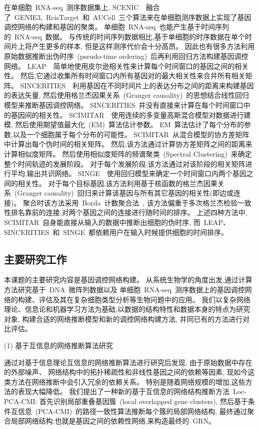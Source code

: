 在单细胞~RNA-seq~测序数据集上, 
SCENIC~\cite{aibar2017scenic}~融合了~GENIE3,~RcisTarget~和~AUCell~三个算法来在单细胞测序数据上实现了基因调控网络的构建和基因的聚类。
单细胞~RNA-seq~也能产生基于时间序列的~RNA-seq~数据。
与传统的时间序列数据相比,基于单细胞的时序数据在单个时间片上将产生更多的样本, 但是这样测序代价会十分高昂。
因此也有很多方法利用原始数据推断出伪时序~(pseudo-time ordering)~后再利用回归方法构建基因调控网络。
LEAP~\cite{specht2017leap}~简单地使用皮尔逊相关性来计算每个时间窗口的基因之间的相关性。 
然后,它通过收集所有时间窗口内所有基因对的最大相关性来合并所有相关矩阵。
SINCERITIES~\cite{papili2017sincerities}~利用基因在不同时间片上的表达分布之间的距离来构建基因的表达矢量,
然后使用格兰杰因果关系~(Granger causality)~的思想结合线性回归模型来推断基因调控网络。
SINCERITIES~并没有直接来计算在每个时间窗口中的基因间的相关性。
SCIMITAR~\cite{cordero2017tracing}~使用连续的多变量高斯混合模型对数据进行建模,
然后使用期望值最大化~(EM)~算法估计参数。
EM~算法估计了每个分布的参数,以及一个细胞属于每个分布的可能性。
SCIMITAR~从混合模型的协方差矩阵中计算出每个伪时间的相关矩阵。
然后,该方法通过计算协方差矩阵之间的距离来计算相似度矩阵。
然后使用相似度矩阵的频谱聚类~(Spectral Clustering)~来确定整个时间轨迹的发展阶段。
对于每个发展阶段,该方法通过对该阶段的相关矩阵进行平均,输出共识网络。
SINGE~\cite{deshpande2019network}~使用回归模型来确定一个时间窗口内两个基因之间的相关性。
对于每个目标基因,该方法利用基于核函数的格兰杰因果关系~(Granger causality)~回归来计算该基因与所有其它基因的相关性(即边或连接)。
聚合时该方法采用~Borda~计数聚合法~\cite{van2000variants},
该方法偏重于多次格兰杰检验一致性排名靠前的连接,对两个基因之间的连接进行随时间的排序。
上述四种方法中, SCIMITAR~自身能直接从输入的数据中推断出细胞的伪时序, 
而~LEAP、SINCERITIES~和~SINGE~都依赖用户在输入时候提供细胞的时间排序。

\subsection{主要研究工作}
本课题的主要研究内容是基因调控网络构建。
从系统生物学的角度出发,通过计算方法研究基于~DNA~微阵列数据以及
单细胞~RNA-seq~测序数据上的基因调控网络的构建、评估及其在复杂细胞类型分析等生物问题中的应用。
我们以复杂网络理论、信息论和机器学习方法为基础,以数据的结构特性和数据本身的特点为研究对象,
构建合适的网络推断模型和新的调控网络构建方法,
并同已有的方法进行对比评估。

(1) 基于互信息的网络推断算法研究

通过对基于信息理论互信息的网络推断算法进行研究后发现,
由于原始数据中存在的外部噪声、
网络结构中的拓扑稀疏性和非线性基因之间的依赖等因素,
现如今这类方法在网络推断中会引入冗余的依赖关系。
特别是随着网络规模的增加,这些方法的表现大幅降低。
我们提出了一种新的基于互信息的网络结构推断方法~Loc-PCA-CMI:
首先识别局部重叠基因簇~(local overlapped gene clusters),
然后基于条件互信息~(PCA-CMI)~的路径一致性算法推断每个簇的局部网络结构,
最终通过聚合局部网络结构,也就是基因之间的依赖性网络,来构造最终的~GRN。

